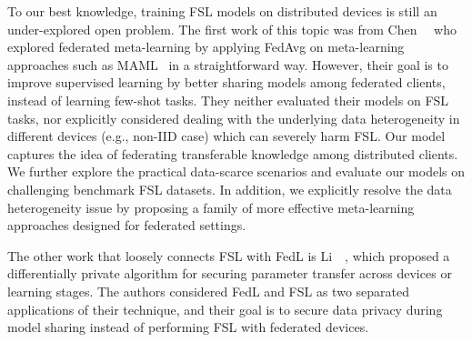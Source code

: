 To our best knowledge, training FSL models on distributed devices is still an under-explored open problem. 
The first work of this topic was from
Chen~\etal~\cite{chen2018fedmeta} who explored federated meta-learning by applying FedAvg on meta-learning approaches such as MAML~\cite{finn2017model} in a straightforward way. However, their goal is to improve supervised learning by better sharing models among
federated clients, instead of learning few-shot tasks.
They neither evaluated their models on FSL tasks, nor explicitly considered dealing with the underlying data heterogeneity in different devices (e.g., non-IID case) which can severely harm FSL.
Our model captures the idea of federating transferable knowledge
among distributed clients. We further explore the practical data-scarce scenarios and evaluate our models on challenging benchmark FSL datasets.
In addition, we explicitly resolve the data heterogeneity issue by proposing a family of more effective meta-learning approaches designed for federated settings.

The other work that loosely connects FSL with FedL
is Li~\etal~\cite{li2020diff}, which proposed a differentially private algorithm for securing parameter transfer across devices or learning stages. The authors considered FedL and FSL as two separated applications of their technique, and their goal is to secure data privacy during model sharing instead of performing FSL with federated devices.



